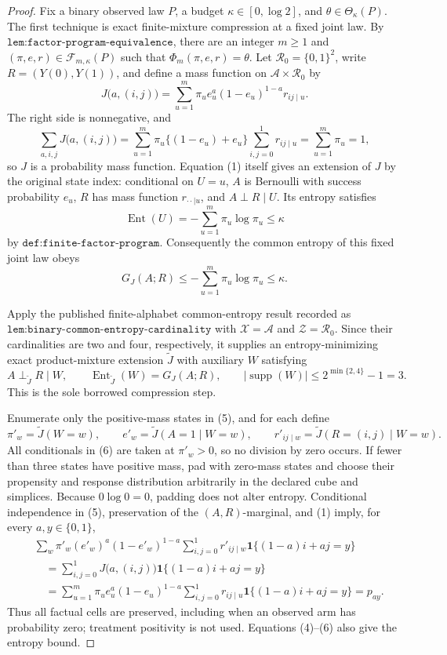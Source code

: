 \documentclass{article}
\begin{document}
\begin{proof}
Fix a binary observed law \(P\), a budget \(\kappa\in[0,\log2]\), and \(\theta\in\Theta_\kappa(P)\).  The first technique is exact finite-mixture compression at a fixed joint law.  By \(\texttt{lem:factor-program-equivalence}\), there are an integer \(m\geq1\) and \((\pi,e,r)\in\mathcal F_{m,\kappa}(P)\) such that \(\Phi_m(\pi,e,r)=\theta\).  Let \(\mathcal R_0=\{0,1\}^2\), write \(R=(Y(0),Y(1))\), and define a mass function on \(\mathcal A\times\mathcal R_0\) by
\[
J\bigl(a,(i,j)\bigr)=\sum_{u=1}^m\pi_u e_u^a(1-e_u)^{1-a}r_{ij\mid u}.
\tag{1}
\]
The right side is nonnegative, and
\[
\sum_{a,i,j}J\bigl(a,(i,j)\bigr)
=\sum_{u=1}^m\pi_u\{(1-e_u)+e_u\}
 \sum_{i,j=0}^1r_{ij\mid u}
=\sum_{u=1}^m\pi_u=1,
\tag{2}
\]
so \(J\) is a probability mass function.  Equation (1) itself gives an extension of \(J\) by the original state index: conditional on \(U=u\), \(A\) is Bernoulli with success probability \(e_u\), \(R\) has mass function \(r_{\cdot\cdot\mid u}\), and \(A\perp R\mid U\).  Its entropy satisfies
\[
\operatorname{Ent}(U)=-\sum_{u=1}^m\pi_u\log\pi_u\leq\kappa
\tag{3}
\]
by \(\texttt{def:finite-factor-program}\).  Consequently the common entropy of this fixed joint law obeys
\[
G_J(A;R)\leq-\sum_{u=1}^m\pi_u\log\pi_u\leq\kappa.
\tag{4}
\]

Apply the published finite-alphabet common-entropy result recorded as \(\texttt{lem:binary-common-entropy-cardinality}\) with \(\mathcal X=\mathcal A\) and \(\mathcal Z=\mathcal R_0\).  Since their cardinalities are two and four, respectively, it supplies an entropy-minimizing exact product-mixture extension \(\widetilde J\) with auxiliary \(W\) satisfying
\[
A\perp_{\widetilde J}R\mid W,\qquad
\operatorname{Ent}_{\widetilde J}(W)=G_J(A;R),\qquad
|\operatorname{supp}(W)|\leq2^{\min\{2,4\}}-1=3.
\tag{5}
\]
This is the sole borrowed compression step.

Enumerate only the positive-mass states in (5), and for each define
\[
\pi'_w=\widetilde J(W=w),\qquad
e'_w=\widetilde J(A=1\mid W=w),\qquad
r'_{ij\mid w}=\widetilde J(R=(i,j)\mid W=w).
\tag{6}
\]
All conditionals in (6) are taken at \(\pi'_w>0\), so no division by zero occurs.  If fewer than three states have positive mass, pad with zero-mass states and choose their propensity and response distribution arbitrarily in the declared cube and simplices.  Because \(0\log0=0\), padding does not alter entropy.  Conditional independence in (5), preservation of the \((A,R)\)-marginal, and (1) imply, for every \(a,y\in\{0,1\}\),
\[
\begin{aligned}
&\sum_w\pi'_w(e'_w)^a(1-e'_w)^{1-a}
 \sum_{i,j=0}^1r'_{ij\mid w}\mathbf 1\{(1-a)i+aj=y\}\\
&\quad=\sum_{i,j=0}^1J\bigl(a,(i,j)\bigr)\mathbf 1\{(1-a)i+aj=y\}\\
&\quad=\sum_{u=1}^m\pi_u e_u^a(1-e_u)^{1-a}
 \sum_{i,j=0}^1r_{ij\mid u}\mathbf 1\{(1-a)i+aj=y\}
=p_{ay}.
\end{aligned}
\tag{7}
\]
Thus all factual cells are preserved, including when an observed arm has probability zero; treatment positivity is not used.  Equations (4)--(6) also give the entropy bound.


\end{proof}
\end{document}

